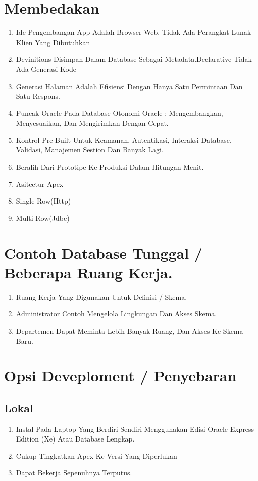 \documentclass{article}
\begin{document}
\section{Membedakan}
\usepackage{ciri:}
\begin{enumerate}
    \item Ide Pengembangan App Adalah Browser Web. Tidak Ada Perangkat Lunak Klien Yang Dibutuhkan
    \item Devinitions Disimpan Dalam Database Sebagai Metadata.Declarative Tidak Ada Generasi Kode
    \item Generasi Halaman Adalah Efisiensi Dengan Hanya Satu Permintaan Dan Satu Respons.
    \item Puncak Oracle Pada Database Otonomi Oracle : Mengembangkan, Menyesuaikan, Dan Mengirimkan Dengan Cepat.
    \item Kontrol Pre-Built Untuk Keamanan, Autentikasi, Interaksi Database, Validasi, Manajemen Sestion Dan Banyak Lagi.
    \item Beralih Dari Prototipe Ke Produksi Dalam Hitungan Menit.
    \item Asitectur Apex
    \item Single Row(Http)
    \item Multi Row(Jdbc)

\end{enumerate}

\section{Contoh Database Tunggal / Beberapa Ruang Kerja.}
\begin{enumerate}
    \item Ruang Kerja Yang Digunakan Untuk Definisi / Skema.
    \item Administrator Contoh Mengelola Lingkungan Dan Akses Skema.
    \item Departemen Dapat Meminta Lebih Banyak Ruang, Dan Akses Ke Skema Baru.
    

\end{enumerate}

\section{Opsi Deveploment / Penyebaran}
    \subsection{Lokal}
    \begin{enumerate}
    \item Instal Pada Laptop Yang Berdiri Sendiri Menggunakan Edisi Oracle Express Edition (Xe) Atau Database Lengkap.
    \item Cukup Tingkatkan Apex Ke Versi Yang Diperlukan
    \item Dapat Bekerja Sepenuhnya Terputus.

    \end{enumerate}
    
\end{document}

